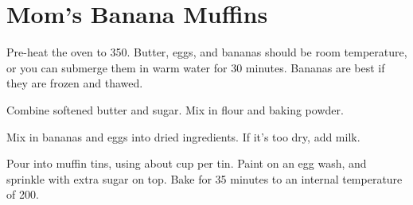 \section{Mom's Banana Muffins}
\begin{recipe}


Pre-heat the oven to 350\degree{}. 
Butter, eggs, and bananas should be room temperature, or you
can submerge them in warm water for 30 minutes. 
Bananas are best if they are frozen and thawed. 


Combine softened butter and sugar. Mix in flour and baking powder. 


Mix in bananas and eggs into dried ingredients. If it's 
too dry, add milk. 

Pour into muffin tins, using about  cup per tin. 
Paint on an egg wash, and sprinkle with extra sugar on top. 
Bake for 35 minutes to an internal temperature of 200\degree{}. 

\end{recipe}
